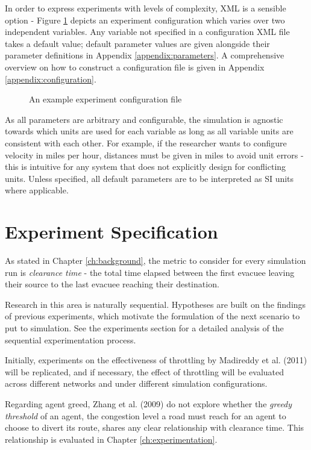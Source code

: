 In order to express experiments with levels of complexity, XML is a sensible option - Figure \ref{fig:config_example} depicts an experiment configuration which varies over two independent variables. Any variable not specified in a configuration XML file takes a default value; default parameter values are given alongside their parameter definitions in Appendix \ref{appendix:parameters}. A comprehensive overview on how to construct a configuration file is given in Appendix \ref{appendix:configuration}.

\begin{figure}
    \centering
    \footnotesize{}
    \caption{An example experiment configuration file}
    \label{fig:config_example}
\end{figure}
As all parameters are arbitrary and configurable, the simulation is agnostic towards which units are used for each variable as long as all variable units are consistent with each other. For example, if the researcher wants to configure velocity in miles per hour, distances must be given in miles to avoid unit errors - this is intuitive for any system that does not explicitly design for conflicting units. Unless specified, all default parameters are to be interpreted as SI units where applicable.

\section{Experiment Specification}

As stated in Chapter \ref{ch:background}, the metric to consider for every simulation run is \textit{clearance time} - the total time elapsed between the first evacuee leaving their source to the last evacuee reaching their destination.

Research in this area is naturally sequential. Hypotheses are built on the findings of previous experiments, which motivate the formulation of the next scenario to put to simulation. See the experiments section for a detailed analysis of the sequential experimentation process.

Initially, experiments on the effectiveness of throttling by Madireddy et al. (2011) will be replicated, and if necessary, the effect of throttling will be evaluated across different networks and under different simulation configurations.

Regarding agent greed, Zhang et al. (2009) do not explore whether the \textit{greedy threshold} of an agent, the congestion level a road must reach for an agent to choose to divert its route, shares any clear relationship with clearance time. This relationship is evaluated in Chapter \ref{ch:experimentation}.